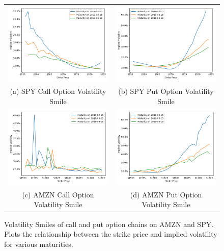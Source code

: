 \documentclass[10pt]{article}
\begin{document}
        \begin{figure}
            \begin{tabular}{cc}
                \includegraphics[width=.475\textwidth]{bin/vol_smile/SPY_Call_2DVolSmile.png} &
                \includegraphics[width=.475\textwidth]{bin/vol_smile/SPY_Put_2DVolSmile.png} \\
                (a) SPY Call Option Volatility Smile &
                (b) SPY Put Option Volatility Smile \\
                \includegraphics[width=.475\textwidth]{bin/vol_smile/AMZN_Call_2DVolSmile.png} &
                \includegraphics[width=.475\textwidth]{bin/vol_smile/AMZN_Put_2DVolSmile.png} \\
                (c) AMZN Call Option Volatility Smile &
                (d) AMZN Put Option Volatility Smile
            \end{tabular}
            \label{fig:volatility_smiles}
            \caption{Volatility Smiles of call and put option chains on AMZN and SPY. Plots the relationship between the strike price and implied volatility for various maturities.}
        \end{figure}
\end{document}
